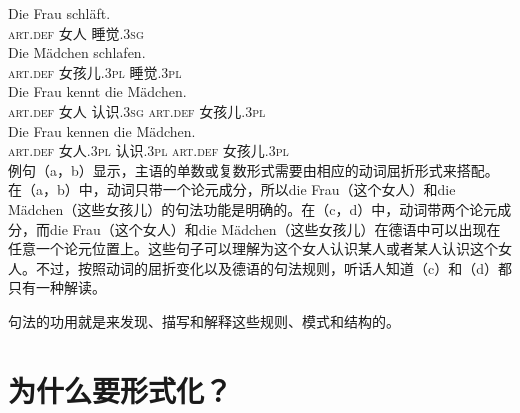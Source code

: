 \eal
\label{Beispiel-mit-Kongruenz}
\ex 
\gll Die Frau schläft.\\
     \textsc{art}.\textsc{def} 女人 睡觉.\textsc{3sg}\\
\ex 
\gll Die Mädchen schlafen.\\
     \textsc{art}.\textsc{def} 女孩儿.\textsc{3pl} 睡觉.\textsc{3pl}\\
\ex 
\gll Die Frau kennt die Mädchen.\\
     \textsc{art}.\textsc{def} 女人 认识.\textsc{3sg} \textsc{art}.\textsc{def} 女孩儿.\textsc{3pl}\\
\ex 
\gll Die Frau kennen die Mädchen.\\
     \textsc{art}.\textsc{def} 女人.\textsc{3pl} 认识.\textsc{3pl} \textsc{art}.\textsc{def} 女孩儿.\textsc{3pl}\\
\zl
例句（a，b）显示，主语的单数或复数形式需要由相应的动词屈折形式来搭配。在（a，b）中，动词只带一个论元成分，所以die Frau（这个女人）和die Mädchen（这些女孩儿）的句法功能是明确的。在（c，d）中，动词带两个论元成分，而die Frau（这个女人）和die Mädchen（这些女孩儿）在德语中可以出现在任意一个论元位置上。这些句子可以理解为这个女人认识某人或者某人认识这个女人。不过，按照动词的屈折变化以及德语的句法规则，听话人知道（c）和（d）都只有一种解读。
 
句法的功用就是来发现、描写和解释这些规则、模式和结构的。

\section{为什么要形式化？}
\label{sec-formal}

